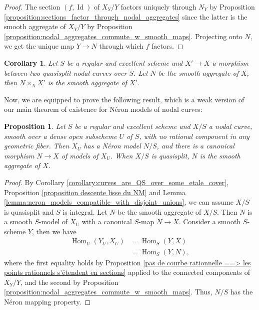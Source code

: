 \documentclass[a4paper,10pt,twoside]{article}
\DeclareMathOperator{\Hom}{Hom}
\DeclareMathOperator{\Id}{Id}
\newtheorem{cor}[thm]{Corollary}
\newtheorem{prop}[thm]{Proposition}
\theoremstyle{definition}
\theoremstyle{remark}
\begin{document}
\begin{proof}
The section $(f,\Id)$ of $X_Y/Y$ factors uniquely through $N_Y$ by Proposition \ref{proposition:sections_factor_through_nodal_aggregates} since the latter is the smooth aggregate of $X_Y/Y$ by Proposition \ref{proposition:nodal_aggregates_commute_w_smooth_maps}. Projecting onto $N$, we get the unique map $Y\to N$ through which $f$ factors.
\end{proof}

\begin{cor}\label{corollary:nodal_aggregates_commute_w_refinements}
Let $S$ be a regular and excellent scheme and $X'\to X$ a morphism between two quasisplit nodal curves over $S$. Let $N$ be the smooth aggregate of $X$, then $N\times_X X'$ is the smooth aggregate of $X'$.
\end{cor}

Now, we are equipped to prove the following result, which is a weak version of our main theorem of existence for N\'eron models of nodal curves:

\begin{prop}\label{proposition:ns-neron_models_of_nodal_curves_1}
Let $S$ be a regular and excellent scheme and $X/S$ a nodal curve, smooth over a dense open subscheme $U$ of $S$, with no rational component in any geometric fiber. Then $X_U$ has a N\'eron model $N/S$, and there is a canonical morphism $N\to X$ of models of $X_U$. When $X/S$ is quasisplit, $N$ is the smooth aggregate of $X$.
\end{prop}


\begin{proof}
By Corollary \ref{corollary:curves_are_QS_over_some_etale_cover}, Proposition \ref{proposition descente lisse du NM} and Lemma \ref{lemma:neron_models_compatible_with_disjoint_unions}, we can assume $X/S$ is quasisplit and $S$ is integral. Let $N$ be the smooth aggregate of $X/S$. Then $N$ is a smooth $S$-model of $X_U$ with a canonical $S$-map $N\to X$. Consider a smooth $S$-scheme $Y$, then we have
\begin{align*}
\Hom_U(Y_U,X_U)&=\Hom_S(Y,X)\\
&=\Hom_S(Y,N),
\end{align*}
where the first equality holds by Proposition \ref{pas de courbe rationnelle ==> les points rationnels s'étendent en sections} applied to the connected components of $X_Y/Y$, and the second by Proposition \ref{proposition:nodal_aggregates_commute_w_smooth_maps}. Thus, $N/S$ has the N\'eron mapping property.
\end{proof}
\end{document}

